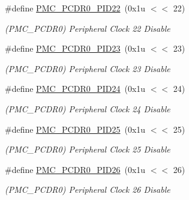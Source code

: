 \begin{DoxyCompactItemize}
\mbox{\label{group__SAME70__PMC_ga0adbf36c7daec359873b705fb066c366}} 
\#define \mbox{\hyperlink{group__SAME70__PMC_ga0adbf36c7daec359873b705fb066c366}{P\+M\+C\+\_\+\+P\+C\+D\+R0\+\_\+\+P\+I\+D22}}~(0x1u $<$$<$ 22)
\begin{DoxyCompactList}\small\item\em (P\+M\+C\+\_\+\+P\+C\+D\+R0) Peripheral Clock 22 Disable \end{DoxyCompactList}\item 
\mbox{\label{group__SAME70__PMC_gad2563764739c10422a7051bee751da88}} 
\#define \mbox{\hyperlink{group__SAME70__PMC_gad2563764739c10422a7051bee751da88}{P\+M\+C\+\_\+\+P\+C\+D\+R0\+\_\+\+P\+I\+D23}}~(0x1u $<$$<$ 23)
\begin{DoxyCompactList}\small\item\em (P\+M\+C\+\_\+\+P\+C\+D\+R0) Peripheral Clock 23 Disable \end{DoxyCompactList}\item 
\mbox{\label{group__SAME70__PMC_ga3e3e3730708d08656a1d6b2c35a96970}} 
\#define \mbox{\hyperlink{group__SAME70__PMC_ga3e3e3730708d08656a1d6b2c35a96970}{P\+M\+C\+\_\+\+P\+C\+D\+R0\+\_\+\+P\+I\+D24}}~(0x1u $<$$<$ 24)
\begin{DoxyCompactList}\small\item\em (P\+M\+C\+\_\+\+P\+C\+D\+R0) Peripheral Clock 24 Disable \end{DoxyCompactList}\item 
\mbox{\label{group__SAME70__PMC_ga5388a9602d3a894175478b7b06e71d76}} 
\#define \mbox{\hyperlink{group__SAME70__PMC_ga5388a9602d3a894175478b7b06e71d76}{P\+M\+C\+\_\+\+P\+C\+D\+R0\+\_\+\+P\+I\+D25}}~(0x1u $<$$<$ 25)
\begin{DoxyCompactList}\small\item\em (P\+M\+C\+\_\+\+P\+C\+D\+R0) Peripheral Clock 25 Disable \end{DoxyCompactList}\item 
\mbox{\label{group__SAME70__PMC_gad50968f0a06aa7996f16c45b27677d0f}} 
\#define \mbox{\hyperlink{group__SAME70__PMC_gad50968f0a06aa7996f16c45b27677d0f}{P\+M\+C\+\_\+\+P\+C\+D\+R0\+\_\+\+P\+I\+D26}}~(0x1u $<$$<$ 26)
\begin{DoxyCompactList}\small\item\em (P\+M\+C\+\_\+\+P\+C\+D\+R0) Peripheral Clock 26 Disable \end{DoxyCompactList}\item 
$$
\end{DoxyCompactItemize}
